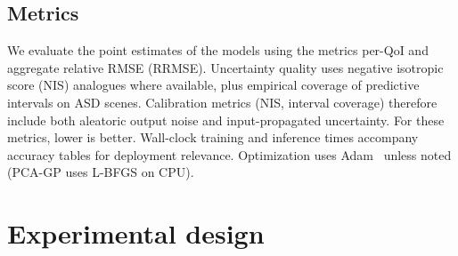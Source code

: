\documentclass[11pt]{article}
\newcommand{\noise}{\sigma^2}
\newcommand{\Sig}{\Sigma}
\newcommand{\Om}{\Omega}
\begin{document}







\subsection{Metrics}
\label{sec:metrics}

We evaluate the point estimates of the models using the metrics per-QoI and aggregate relative RMSE (RRMSE).
Uncertainty quality uses negative isotropic score (NIS) analogues where available, plus
empirical coverage of predictive intervals on ASD scenes. Calibration metrics (NIS, interval coverage) therefore include both aleatoric output
noise and input-propagated uncertainty. For these metrics, lower is better.
Wall-clock training and inference times accompany accuracy tables for deployment
relevance.
Optimization uses Adam~\cite{kingma2015adam} unless noted (PCA-GP uses L-BFGS on CPU).

\section{Experimental design}
\label{sec:design}
\end{document}
